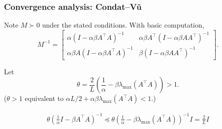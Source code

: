 \documentclass[10pt,mathserif]{beamer}
\begin{document}
\begin{frame}
\frametitle{Convergence analysis: Condat--V\~u}
Note $M\succ 0$ under the stated conditions.
With basic computation,
\[
M^{-1}=
\begin{bmatrix}
\alpha (I-\alpha\beta A^\intercal A)^{-1}& \alpha \beta A^\intercal (I-\alpha\beta AA^\intercal)^{-1}\\
\alpha\beta A (I-\alpha\beta A^\intercal A)^{-1}&
\beta (I-\alpha\beta AA^\intercal)^{-1}
\end{bmatrix}.
\]

Let
\[
\theta=
\frac{2}{L}\left(\frac{1}{\alpha}-\beta \lambda_\mathrm{max}(A^\intercal A)\right)
>1.
\]
($\theta>1$ equivalent to $\alpha L/2+\alpha \beta \lambda_\mathrm{max}(A^\intercal A)<1$.)

\vspace{0.2in}
\begin{align*}
\theta\left(\frac{1}{\alpha} I-\beta A^\intercal A\right)^{-1}
\preceq 
\theta\left(\frac{1}{\alpha} -\beta \lambda_\mathrm{max}(A^\intercal A)\right)^{-1}
\!\!\!I
=
\frac{2}{L}I
\end{align*}

\end{frame}
\end{document}
